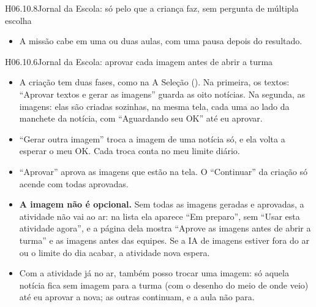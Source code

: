 \begin{historia}{H06.10.8}{Jornal da Escola: só pelo que a criança faz, sem pergunta de múltipla escolha}{\parcial}
\begin{itemize}
    as armadilhas mais escolhidas na Chave, quantos escolheram \enquote{Olho a
    próxima pista} e \enquote{Só na primeira notícia}, e quantos repassaram a
    mensagem sem abrir nenhuma pista. O nível de cada estudante fica no painel
    de habilidades, só para ele.
  \item A missão cabe em uma ou duas aulas, com uma pausa depois do resultado.
\end{itemize}
\end{historia}

\begin{historia}{H06.10.6}{Jornal da Escola: aprovar cada imagem antes de abrir a turma}{\parcial}
\aceite
\begin{itemize}
  \item A criação tem duas fases, como na A Seleção (). Na
    primeira, os textos: \enquote{Aprovar textos e gerar as imagens} guarda as
    oito notícias. Na segunda, as imagens: elas são criadas sozinhas, na mesma
    tela, cada uma ao lado da manchete da notícia, com \enquote{Aguardando seu
    OK} até eu aprovar.
  \item \enquote{Gerar outra imagem} troca a imagem de uma notícia só, e ela
    volta a esperar o meu OK. Cada troca conta no meu limite diário.
  \item \enquote{Aprovar} aprova as imagens que estão na tela. O
    \enquote{Continuar} da criação só acende com todas aprovadas.
  \item \textbf{A imagem não é opcional.} Sem todas as imagens geradas e
    aprovadas, a atividade não vai ao ar: na lista ela aparece \enquote{Em
    preparo}, sem \enquote{Usar esta atividade agora}, e a página dela mostra
    \enquote{Aprove as imagens antes de abrir a turma} e as imagens antes das
    equipes. Se a IA de imagens estiver fora do ar ou o limite do dia acabar, a
    atividade nova espera.
  \item Com a atividade já no ar, também posso trocar uma imagem: só aquela
    notícia fica sem imagem para a turma (com o desenho do meio de onde veio)
    até eu aprovar a nova; as outras continuam, e a aula não para.

\end{itemize}
\end{historia}
